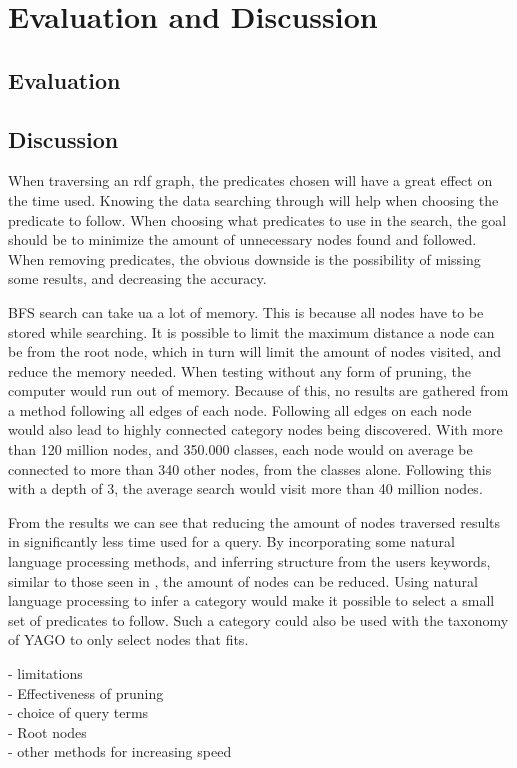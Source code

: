 \chapter{Evaluation and Discussion}
\label{cha:Discussion}

\section{Evaluation}
\label{sec:Evaluation}


\section{Discussion}
\label{sec:Discussion}
When traversing an rdf graph, the predicates chosen will have a great effect on the time used. Knowing the data searching through will help when choosing the predicate to follow. When choosing what predicates to use in the search, the goal should be to minimize the amount of unnecessary nodes found and followed. When removing predicates, the obvious downside is the possibility of missing some results, and decreasing the accuracy.

BFS search can take ua a lot of memory. This is because all nodes have to be stored while searching. It is possible to limit the maximum distance a node can be from the root node, which in turn will limit the amount of nodes visited, and reduce the memory needed. When testing without any form of pruning, the computer would run out of memory. Because of this, no results are gathered from a method following all edges of each node. Following all edges on each node would also lead to highly connected category nodes being discovered. With more than 120 million nodes, and 350.000 classes, each node would on average be connected to more than 340 other nodes, from the classes alone. Following this with a depth of 3, the average search would visit more than 40 million nodes.

From the results we can see that reducing the amount of nodes traversed results in significantly less time used for a query. By incorporating some natural language processing methods, and inferring structure from the users keywords, similar to those seen in \cite{4812421, aqualog}, the amount of nodes can be reduced. Using natural language processing to infer a category would make it possible to select a small set of predicates to follow. Such a category could also be used with the taxonomy of YAGO to only select nodes that fits.

- limitations\\
- Effectiveness of pruning\\
- choice of query terms\\
- Root nodes\\
- other methods for increasing speed\\
